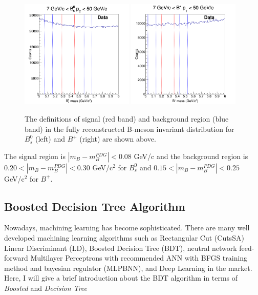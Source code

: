 \begin{figure}[h]
\begin{center}
\includegraphics[width= 0.48\textwidth]{Figures/Chapter5/BsData.png}
\includegraphics[width= 0.48\textwidth]{Figures/Chapter5/BPData.png}
\caption{The definitions of signal (red band) and background region (blue band) in the fully reconstructed B-meson invariant distribution for $B^0_s$ (left) and $B^+$ (right) are shown above.}
\label{SigBackRegion}
\end{center}
\end{figure}

The signal region is $|m_B - m_B^{PDG}| < 0.08$ GeV/c and the background region is $0.20 < |m_B - m_B^{PDG}| < 0.30$ GeV/c$^2$ for $B^0_s$ and $0.15 < |m_B - m_B^{PDG}| < 0.25$ GeV/c$^2$  for $B^+$.


\subsection{Boosted Decision Tree Algorithm}

Nowadays, machining learning has become sophisticated. There are many well developed machining learning algorithms such as Rectangular Cut (CutsSA) Linear Discriminant (LD), Boosted Decision Tree (BDT), neutral network feed-forward Multilayer Perceptrons with recommended ANN with BFGS training method and bayesian regulator (MLPBNN), and Deep Learning in the market. Here, I will give a brief introduction about the BDT algorithm in terms of \textit{Boosted} and \textit{Decision Tree}

